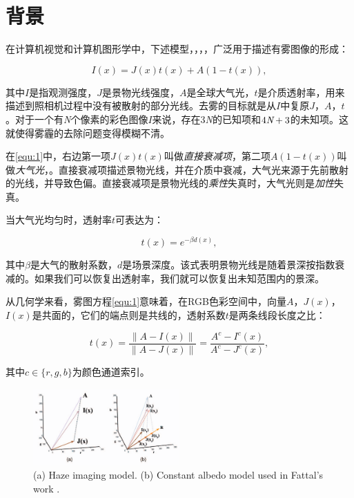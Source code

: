 \documentclass{ctexart}
\begin{document}
\section{背景}
在计算机视觉和计算机图形学中，下述模型\cite{NarasimhanNayar2002}，\cite{NarasimhanNayar2000}，\cite{Fattal2008}，\cite{Tan2008}，广泛用于描述有雾图像的形成：

\begin{equation}\label{equ:1}
    I(x) = J(x)t(x) + A(1 - t(x)),
\end{equation}

其中$I$是指观测强度，$J$是景物光线强度，$A$是全球大气光，$t$是介质透射率，用来描述到照相机过程中没有被散射的部分光线。去雾的目标就是从$I$中复原$J$，$A$，$t$。对于一个有\emph{N}个像素的彩色图像$I$来说，存在3\emph{N}的已知项和$4\emph{N}+3$的未知项。这就使得雾霾的去除问题变得模糊不清。\par

在\ref{equ:1}中，右边第一项$J(x)t(x)$叫做\emph{直接衰减项}\cite{Tan2008}，第二项$A(1 - t(x))$叫做\emph{大气光}\cite{Koschmieder1924}，\cite{Tan2008}。直接衰减项描述景物光线，并在介质中衰减，大气光来源于先前散射的光线，并导致色偏。直接衰减项是景物光线的\emph{乘性}失真时，大气光则是\emph{加性}失真。\par

当大气光均匀时，透射率$t$可表达为：

\begin{equation}\label{equ:2}
    t(x) = e^{-\beta d(x)},
\end{equation}

其中$\beta$是大气的散射系数，$d$是场景深度。该式表明景物光线是随着景深按指数衰减的。如果我们可以恢复出透射率，我们就可以恢复出未知范围内的景深。\par

从几何学来看，雾图方程\ref{equ:1}意味着，在RGB色彩空间中，向量$A$，$J(x)$，$I(x)$是共面的，它们的端点则是共线的，透射系数$t$是两条线段长度之比：

\begin{equation}\label{equ:3}
    t(x) = \frac{\| A - I(x) \|}{\| A - J(x) \|} = \frac{A^c - I^c(x)}{A^c - J^c(x)},
\end{equation}

其中$c \in \{r, g, b\} $为颜色通道索引。\par

\begin{figure}[bp]
    \centering
    \includegraphics[width=0.5\textwidth]{img/01.png}
    \caption{(a) Haze imaging model. (b) Constant albedo model used in Fattal’s work \cite{Fattal2008}.}
    \label{fig:02}
\end{figure}
\end{document}
